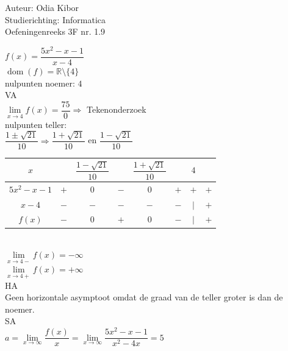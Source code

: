 \documentclass[a4paper]{article}
\begin{document}
  
\noindent \large Auteur: Odia Kibor \\
\noindent \large Studierichting: Informatica\\
\noindent \large Oefeningenreeks 3F nr. 1.9\\

\medskip

\normalsize


$f(x) = \dfrac{5x^2 -x -1}{x - 4}$\\

$\operatorname{dom}(f)=\mathbb{R}\setminus\{4\}$\\

nulpunten noemer: $4$\\

VA\\

$\lim\limits_{x \rightarrow 4}f(x) = \dfrac{75}{0} \Rightarrow $ Tekenonderzoek \\

nulpunten teller:\\

$\dfrac{1\pm \sqrt{21}}{10} \Rightarrow \dfrac{1+\sqrt{21}}{10}$ en $\dfrac{1-\sqrt{21}}{10}$\\

\begin{tabular}{c|ccccccc}
$x$     &      &  $\dfrac{1-\sqrt{21}}{10}$ &       &  $\dfrac{1+\sqrt{21}}{10}$  & & $4$ &   \\ \hline
$5x^2 -x -1$   & $+$  &  $0$  &  $-$     &  $0$  & $+$ & $+$ & $+$\\
$x-4$  & $-$  &  $-$  &  $-$     &  $-$  & $-$ & $|$ & $+$\\ \hline
$f(x)$  & $-$  &  $0$  &  $+$     &  $0$  & $-$ & $|$ & $+$\\
\end{tabular}\\

$\lim\limits_{x \rightarrow 4-}f(x) = -\infty$\\

$\lim\limits_{x \rightarrow 4+}f(x) = +\infty$\\

HA\\

Geen horizontale asymptoot omdat de graad van de teller groter is dan de noemer.\\

SA\\

$a = \lim\limits_{x \rightarrow \infty} \dfrac{f(x)}{x} = \lim\limits_{x \rightarrow \infty}\dfrac{5x^2 -x -1}{x^2 - 4x} = 5$\\
\end{document}
